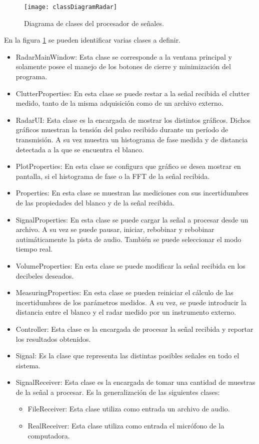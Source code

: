 \begin{figure}
 \centering
 \texttt{[image: classDiagramRadar]}
 \caption{Diagrama de clases del procesador de señales.}
 \label{fig:RadarsClassDiagram}
\end{figure}
En la figura \ref{fig:RadarsClassDiagram} se pueden identificar varias clases a definir.
\begin{itemize}
  \item RadarMainWindow: Esta clase se corresponde a la ventana principal y solamente posee el manejo de los botones de cierre y minimización del programa.
  \item ClutterProperties: En esta clase se puede restar a la señal recibida el clutter medido, tanto de la misma adquisición como de un archivo externo.
  \item RadarUI: Esta clase es la encargada de mostrar los distintos gráficos. Dichos gráficos muestran la tensión del pulso recibido durante un período de transmisión. A su vez muestra un histograma de fase medida y de distancia detectada a la que se encuentra el blanco.
  \item PlotProperties: En esta clase se configura que gráfico se desea mostrar en pantalla, si el histograma de fase o la FFT de la señal recibida.
  \item Properties: En esta clase se muestran las mediciones con sus incertidumbres de las propiedades del blanco y de la señal recibida.
  \item SignalProperties: En esta clase se puede cargar la señal a procesar desde un archivo. A su vez se puede pausar, iniciar, rebobinar y rebobinar autimáticamente la pista de audio. También se puede seleccionar el modo tiempo real.
  \item VolumeProperties: En esta clase se puede modificar la señal recibida en los decibeles deseados.
  \item MeasuringProperties:  En esta clase se pueden reiniciar el cálculo de las incertidumbres de los parámetros medidos. A su vez, se puede introducir la distancia entre el blanco y el radar medido por un instrumento externo.
  \item Controller: Esta clase es la encargada de procesar la señal recibida y reportar los resultados obtenidos.
  \item Signal: Es la clase que representa las distintas posibles señales en todo el sistema.
  \item SignalReceiver: Esta clase es la encargada de tomar una cantidad de muestras de la señal a procesar. Es la generalización de las siguientes clases:
  \begin{itemize}
    \item FileReceiver: Esta clase utiliza como entrada un archivo de audio.
    \item RealReceiver: Esta clase utiliza como entrada el micrófono de la computadora.
  \end{itemize}
\end{itemize}

